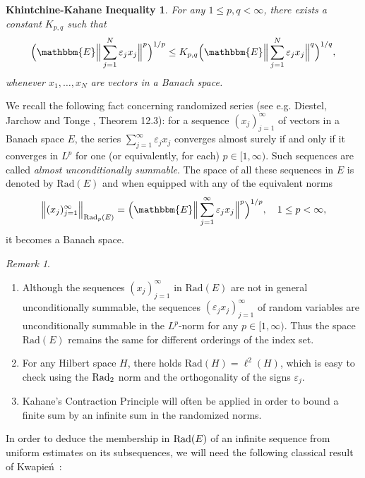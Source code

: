 \documentclass[a4paper,10pt]{amsart}
\theoremstyle{plain}
\newtheorem*{kk}{Khintchine-Kahane Inequality}
\theoremstyle{definition}
\theoremstyle{remark}
\newtheorem*{remark}{Remark}
\begin{document}
\begin{kk}
\label{kkineq}
  For any $1 \leq p,q < \infty$, there exists a constant $K_{p,q}$ such that
  \begin{equation*}
    \Big( {\mathbbm{E}} \Big\| \sum_{j=1}^N \varepsilon_j x_j \Big\|^p \Big)^{1/p}
    \leq K_{p,q} \Big( {\mathbbm{E}} \Big\| \sum_{j=1}^N \varepsilon_j x_j \Big\|^q \Big)^{1/q},
  \end{equation*}
  whenever $x_1, \ldots , x_N$ are vectors in a Banach space.
\end{kk}

We recall the following fact concerning randomized series (see e.g. Diestel, Jarchow and Tonge \cite{DJT}, Theorem 12.3):
for a sequence $(x_j)_{j=1}^{\infty}$ of vectors in a Banach space $E$, the series
$\sum_{j=1}^{\infty} \varepsilon_j x_j$
converges almost surely if and only if it converges in $L^p$ for one (or equivalently, for each) $p\in [1,\infty )$.
Such sequences are called \emph{almost unconditionally summable}. The space of all these sequences in $E$
is denoted by $\text{Rad}(E)$ and when equipped with any of the equivalent norms
\begin{equation*}
  \Big\| (x_j)_{j=1}^{\infty} \Big\|_{\text{Rad}_p(E)} 
  = \Big( {\mathbbm{E}} \Big\| \sum_{j=1}^{\infty} \varepsilon_j x_j \Big\| ^p \Big) ^{1/p}, \quad 1 \leq p < \infty ,
\end{equation*}
it becomes a Banach space.

\begin{remark}\
\begin{enumerate}
\item Although the sequences $(x_j)_{j=1}^{\infty}$ in $\text{Rad}(E)$ are not in general 
unconditionally summable, the sequences $(\varepsilon_j x_j)_{j=1}^{\infty}$ of random variables are unconditionally summable in 
the $L^p$-norm for any  $p\in [1,\infty )$. Thus the space $\text{Rad}(E)$ remains the same for different orderings of the index set.
\item For any Hilbert space $H$, there holds $\text{Rad} (H) = \ell^2(H)$, which is easy to check using the $\textup{Rad}_2$ norm and the orthogonality of the signs $\varepsilon_j$.
\item Kahane's Contraction Principle will often be applied in order to bound a finite sum by an infinite sum in the randomized norms.
\end{enumerate}
\end{remark}

In order to deduce the membership in $\textup{Rad}(E)$ of an infinite sequence from uniform estimates on its subsequences, we will need the following classical result of Kwapie\'n~\cite{KWAPIENC0}: 
\end{document}

